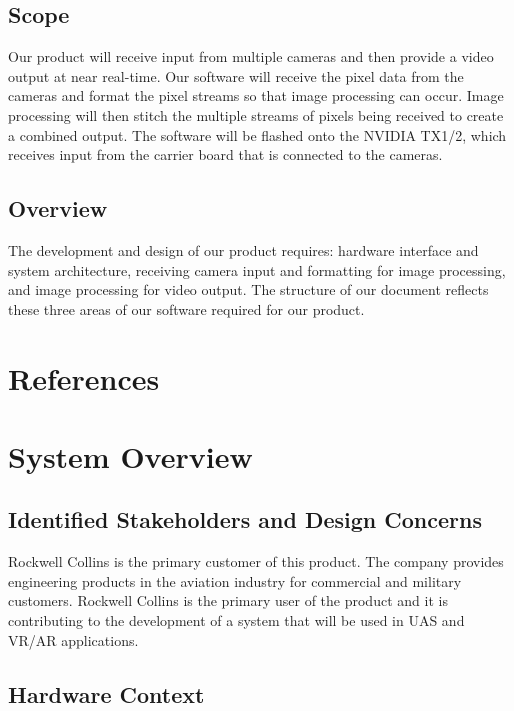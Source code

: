 \documentclass[letterpaper,10pt,serif,draftclsnofoot,onecolumn,compsoc,titlepage]{IEEEtran}
\begin{document}
\subsection{Scope}

Our product will receive input from multiple cameras and then provide a video output at 
near real-time. Our software will receive the pixel data from the cameras and format 
the pixel streams so that image processing can occur. Image processing will then stitch 
the multiple streams of pixels being received to create a combined output. The software 
will be flashed onto the NVIDIA TX1/2, which receives input from the carrier 
board that is connected to the cameras. \\

\subsection{Overview}

The development and design of our product requires: hardware interface and system 
architecture, receiving camera input and formatting for image processing, and image 
processing for video output. The structure of our document reflects these three areas 
of our software required for our product. \\ 

\section{References}




\section{System Overview}  

\subsection{Identified Stakeholders and Design Concerns}

Rockwell Collins is the primary customer of this product. The company provides 
engineering products in the aviation industry for commercial and military customers. 
Rockwell Collins is the primary user of the product and it is contributing 
to the development of a system that will be used in UAS and VR/AR applications. \\

\subsection{Hardware Context}
\end{document}
